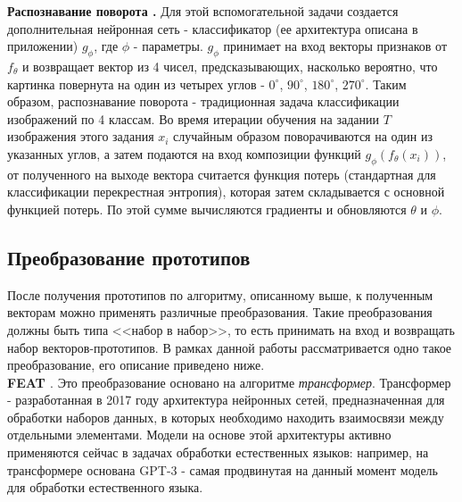 \documentclass[a4paper, 12pt]{report}
\begin{document}
\textbf {Распознавание поворота \cite{rotation}.} Для этой вспомогательной задачи создается дополнительная нейронная сеть - классификатор (ее архитектура описана в приложении) $g_{\phi}$, где $\phi$ - параметры. $g_{\phi}$ принимает на вход векторы признаков от $f_{\theta}$ и возвращает вектор из 4 чисел, предсказывающих, насколько вероятно, что картинка повернута на один из четырех углов - $0^{\circ}$, $90^{\circ}$, $180^{\circ}$, $270^{\circ}$. Таким образом, распознавание поворота - традиционная задача классификации изображений по 4 классам. Во время итерации обучения на задании $T$ изображения этого задания $x_{i}$ случайным образом поворачиваются на один из указанных углов, а затем подаются на вход композиции функций $g_{\phi}(f_{\theta}(x_i))$, от полученного на выходе вектора считается функция потерь (стандартная для классификации перекрестная энтропия), которая затем складывается с основной функцией потерь. По этой сумме вычисляются градиенты и обновляются $\theta$ и $\phi$.

\subsection{Преобразование прототипов}
После получения прототипов по алгоритму, описанному выше, к полученным векторам можно применять различные преобразования. Такие преобразования должны быть типа <<набор в набор>>, то есть принимать на вход и возвращать набор векторов-прототипов. В рамках данной работы рассматривается одно такое преобразование, его описание приведено ниже.\\

\textbf {FEAT \cite{setset}}. Это преобразование основано на алгоритме \textit{трансформер}. Трансформер - разработанная в 2017 году архитектура нейронных сетей, предназначенная для обработки наборов данных, в которых необходимо находить взаимосвязи между отдельными элементами. Модели на основе этой архитектуры активно применяются сейчас в задачах обработки естественных языков: например, на трансформере основана GPT-3 - самая продвинутая на данный момент модель для обработки естественного языка. \\
\end{document}
